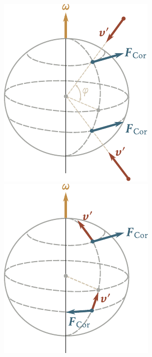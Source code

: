\begin{figure}[t]
	\begin{minipage}[t]{0.5\linewidth}
		\begin{center}
			\includegraphics[scale=1]{figures/ch_04/fig_4_9.pdf}
			\caption[]{}
			\label{fig:4_9}
		\end{center}
	\end{minipage}
	\hspace{-0.05cm}
	\begin{minipage}[t]{0.5\linewidth}
		\begin{center}
			\includegraphics[scale=1.03]{figures/ch_04/fig_4_10.pdf}
			\caption[]{}
			\label{fig:4_10}
		\end{center}
	\end{minipage}
	\vspace{-0.4cm}
\end{figure}

